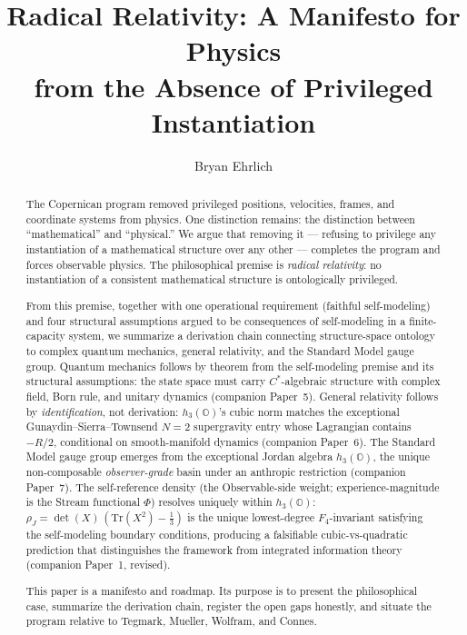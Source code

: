 \documentclass[12pt]{article}
\title{Radical Relativity: A Manifesto for Physics\\from the Absence of Privileged Instantiation}
\author{Bryan Ehrlich}
\date{}
\theoremstyle{remark}
\newcommand{\hthree}{h_3(\mathbb{O})}
\newcommand{\Ffour}{F_4}
\newcommand{\rhoJ}{\rho_J}
\begin{document}
\maketitle


\begin{abstract}
The Copernican program removed privileged positions, velocities, frames,
and coordinate systems from physics.  One distinction remains: the
distinction between ``mathematical'' and ``physical.''  We argue that
removing it --- refusing to privilege any instantiation of a mathematical
structure over any other --- completes the program and forces observable
physics.  The philosophical premise is \emph{radical relativity}: no
instantiation of a consistent mathematical structure is ontologically
privileged.

From this premise, together with one operational requirement (faithful
self-modeling) and four structural assumptions argued to be consequences
of self-modeling in a finite-capacity system, we summarize a derivation
chain connecting structure-space ontology to complex quantum mechanics,
general relativity, and the Standard Model gauge group.  Quantum
mechanics follows by theorem from the self-modeling premise and its
structural assumptions: the state space must carry $C^*$-algebraic
structure with complex field, Born rule, and unitary dynamics (companion
Paper~5).  General relativity follows by \emph{identification}, not derivation:
$\hthree$'s cubic norm matches the exceptional Gunaydin--Sierra--Townsend
$N{=}2$ supergravity entry whose Lagrangian contains $-R/2$, conditional
on smooth-manifold dynamics (companion Paper~6).
The Standard Model gauge group emerges from the exceptional Jordan
algebra $\hthree$, the unique non-composable \emph{observer-grade} basin
under an anthropic restriction (companion Paper~7).  The self-reference density (the Observable-side weight; experience-magnitude
is the Stream functional $\Phi$) resolves uniquely
within $\hthree$: $\rhoJ = \det(X)\,(\mathrm{Tr}(X^2) -
\tfrac{1}{3})$ is the unique lowest-degree $\Ffour$-invariant
satisfying the self-modeling boundary conditions, producing a
falsifiable cubic-vs-quadratic prediction that distinguishes the
framework from integrated information theory (companion Paper~1,
revised).

This paper is a manifesto and roadmap.
Its purpose is to present the philosophical case, summarize the
derivation chain, register the open gaps honestly, and situate the
program relative to Tegmark, Mueller, Wolfram, and Connes.
\end{abstract}
\end{document}
